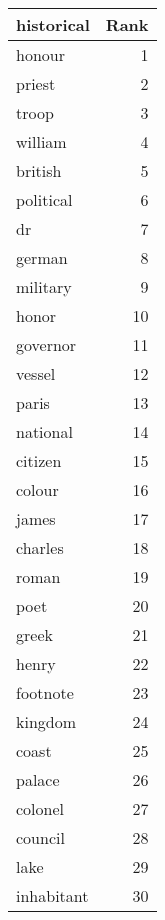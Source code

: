 \begin{table}
\label{tab:historical_terms}
\begin{tabular}{lr}
\toprule
historical & Rank \\
\midrule
honour & 1 \\
priest & 2 \\
troop & 3 \\
william & 4 \\
british & 5 \\
political & 6 \\
dr & 7 \\
german & 8 \\
military & 9 \\
honor & 10 \\
governor & 11 \\
vessel & 12 \\
paris & 13 \\
national & 14 \\
citizen & 15 \\
colour & 16 \\
james & 17 \\
charles & 18 \\
roman & 19 \\
poet & 20 \\
greek & 21 \\
henry & 22 \\
footnote & 23 \\
kingdom & 24 \\
coast & 25 \\
palace & 26 \\
colonel & 27 \\
council & 28 \\
lake & 29 \\
inhabitant & 30 \\
\bottomrule
\end{tabular}
\end{table}
